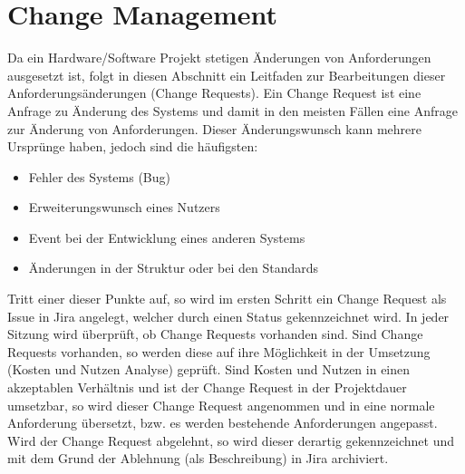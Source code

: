 \section{Change Management}
Da ein Hardware/Software Projekt stetigen Änderungen von Anforderungen ausgesetzt ist, folgt in diesen Abschnitt ein Leitfaden zur Bearbeitungen dieser Anforderungsänderungen (Change Requests).
Ein Change Request ist eine Anfrage zu Änderung des Systems und damit in den meisten Fällen eine Anfrage zur Änderung von Anforderungen.
Dieser Änderungswunsch kann mehrere Ursprünge haben, jedoch sind die häufigsten:
\begin{itemize}
	\item Fehler des Systems (Bug)
	\item Erweiterungswunsch eines Nutzers
	\item Event bei der Entwicklung eines anderen Systems
	\item Änderungen in der Struktur oder bei den Standards
\end{itemize}
Tritt einer dieser Punkte auf, so wird im ersten Schritt ein Change Request als Issue in Jira angelegt, welcher durch einen Status gekennzeichnet wird.
In jeder Sitzung wird überprüft, ob Change Requests vorhanden sind.
Sind Change Requests vorhanden, so werden diese auf ihre Möglichkeit in der Umsetzung (Kosten und Nutzen Analyse) geprüft.
Sind Kosten und Nutzen in einen akzeptablen Verhältnis und ist der Change Request in der Projektdauer umsetzbar, so wird dieser Change Request angenommen und in eine normale Anforderung übersetzt, bzw. es werden bestehende Anforderungen angepasst.
Wird der Change Request abgelehnt, so wird dieser derartig gekennzeichnet und mit dem Grund der Ablehnung (als Beschreibung) in Jira archiviert.